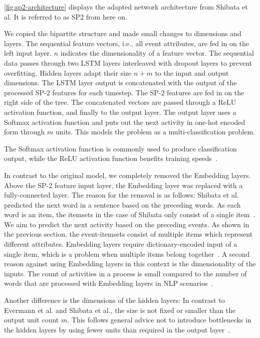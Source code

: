 \autoref{fig:sp2-architecture} displays the adapted network architecture from Shibata et al. It is referred to as SP2 from here on.

We copied the bipartite structure and made small changes to dimensions and layers.
The sequential feature vectors, i.e., all event attributes, are fed in on the left input layer.
$n$ indicates the dimensionality of a feature vector.
The sequential data passes through two LSTM layers interleaved with dropout layers to prevent overfitting.
Hidden layers adapt their size $n+m$ to the input and output dimensions.
The LSTM layer output is concatenated with the output of the processed SP-2 features for each timestep.
The SP-2 features are fed in on the right side of the tree.
The concatenated vectors are passed through a ReLU activation function, and
finally to the output layer. The output layer uses a Softmax activation function and puts out the next activity in one-hot encoded form through $m$ units.
This models the problem as a multi-classification problem.

The Softmax activation function is commonly used to produce classification output,
while the ReLU activation function benefits training speeds~\cite{krizhevsky2012imagenet}.

In contrast to the original model, we completely removed the Embedding layers.
Above the SP-2 feature input layer, the Embedding layer was replaced with a fully-connected layer.
The reason for the removal is as follows: Shibata et al. predicted the next word in a sentence based on the preceding words.
As each word is an item, the itemsets in the case of Shibata only consist of a single item~\cite{shibata2016bipartite}.
We aim to predict the next activity based on the preceding events.
As shown in the previous section, the event-itemsets consist of multiple items which represent different attributes.
Embedding layers require dictionary-encoded input of a single item, which is a problem when multiple items belong together~\cite{goldberg2014word2vec}. A second reason against using Embedding layers in this context is the dimensionality of the inputs. The count of activities in a process is small compared to the number of words that are processed with Embedding layers in NLP scenarios~\cite{goldberg2014word2vec}.

Another difference is the dimensions of the hidden layers: In contrast to Evermann et al. and Shibata et al., the size is not fixed or smaller than the output unit count $m$.
This follows general advice not to introduce bottlenecks in the hidden layers by using fewer units than required in the output layer~\cite{web:techniques-in-convnets,szegedy2016rethinking}.\\

